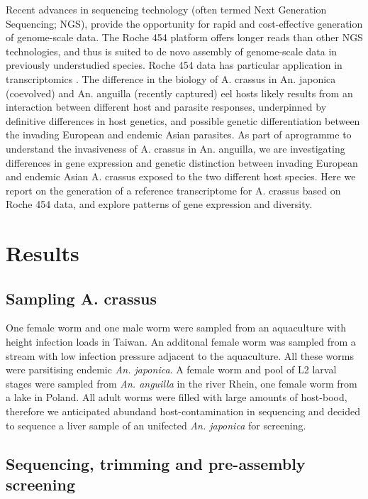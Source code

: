 \documentclass[10pt]{bmc_article}
\newenvironment{bmcformat}{\begin{raggedright}\baselineskip20pt\sloppy\setboolean{publ}{false}}{\end{raggedright}\baselineskip20pt\sloppy}
\begin{document}
\begin{bmcformat}
Recent advances in sequencing technology (often termed Next Generation
Sequencing; NGS), provide the opportunity for rapid and cost-effective
generation of genome-scale data. The Roche 454 platform
\cite{pmid16056220} offers longer reads than other NGS technologies,
and thus is suited to de novo assembly of genome-scale data in
previously understudied species. Roche 454 data has particular
application in transcriptomics \cite{pmid20950480}. The difference in
the biology of A. crassus in An. japonica (coevolved) and An. anguilla
(recently captured) eel hosts likely results from an interaction
between different host and parasite responses, underpinned by
definitive differences in host genetics, and possible genetic
differentiation between the invading European and endemic Asian
parasites. As part of aprogramme to understand the invasiveness of
A. crassus in An. anguilla, we are investigating differences in gene
expression and genetic distinction between invading European and
endemic Asian A. crassus exposed to the two different host
species. Here we report on the generation of a reference transcriptome
for A. crassus based on Roche 454 data, and explore patterns of gene
expression and diversity.

\section*{Results}


\subsection*{Sampling A. crassus}

One female worm and one male worm were sampled from an aquaculture
with height infection loads in Taiwan. An additonal female worm was
sampled from a stream with low infection pressure adjacent to the
aquaculture. All these worms were parsitising endemic
\textit{An. japonica}. A female worm and pool of L2 larval stages were
sampled from \textit{An. anguilla} in the river Rhein, one female worm
from a lake in Poland. All adult worms were filled with large amounts
of host-bood, therefore we anticipated abundand host-contamination in
sequencing and decided to sequence a liver sample of an unifected
\textit{An. japonica} for screening.


 \subsection*{Sequencing, trimming and pre-assembly screening}







\end{bmcformat}
\end{document}
